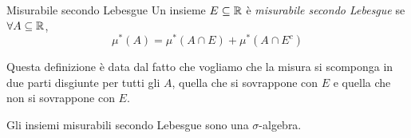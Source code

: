 \documentclass[a4paper]{article}
\begin{document}
\begin{snippetdefinition}{Misurabile secondo Lebesgue}
    Un insieme \(E \subseteq \mathbb{R}\) è \emph{misurabile secondo Lebesgue}
    se \(\forall A \subseteq \mathbb{R}\),
    \[
        \mu^*(A) = \mu^*(A \cap E) + \mu^*(A \cap E^c)
    \]
\end{snippetdefinition}

Questa definizione è data dal fatto che vogliamo che la misura si scomponga in due parti disgiunte
per tutti gli \(A\), quella che si sovrappone con \(E\) e quella che non si sovrappone con \(E\).

\begin{snippettheorem}{}
    Gli insiemi misurabili secondo Lebesgue sono una \(\sigma\)-algebra.
\end{snippettheorem}
\end{document}
